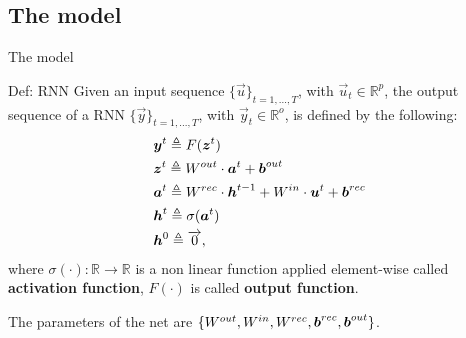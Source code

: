 
\subsection{The model}
\begin{frame}{The model}
	
\begin{block}{Def: RNN}
	Given an input sequence $\{\vec{u}\}_{t=1,...,T}$, with $ \vec{u}_t \in \mathbb{R}^p$, the output sequence of a RNN $\{\vec{y}\}_{t=1,...,T}$, with $\vec{y}_t \in \mathbb{R}^o$,  is defined by the following:
\begin{align}
		&\boldsymbol{y}^t \triangleq F(\boldsymbol{z}^t)\\
		&\boldsymbol{z}^t \triangleq W^{out}\cdot\boldsymbol{a}^t + \boldsymbol{b}^{out}\\
		&\boldsymbol{a}^t \triangleq W^{rec}\cdot\boldsymbol{h}^{t-1}+W^{in}\cdot\boldsymbol{u}^t+\boldsymbol{b}^{rec}\\
		&\boldsymbol{h}^t \triangleq  \sigma(\boldsymbol{a}^t) \\
		&\boldsymbol{h}^0 \triangleq \overrightarrow{0},
\end{align}
where $\sigma(\cdot):\mathbb{R}\rightarrow\mathbb{R}$ is a non linear function applied element-wise called \textbf{activation function}, $F(\cdot)$ is called \textbf{output function}. 
\end{block}

\begin{block}{}
	The parameters of the net are $\{W^{out}, W^{in},  W^{rec}, \boldsymbol{b}^{rec}, \boldsymbol{b}^{out}\}$.
\end{block}
\end{frame}

